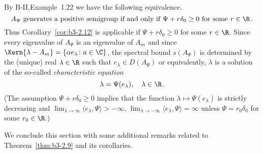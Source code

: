 \begin{example}
\begin{enumerate}[(i), wide]
By B-II,Example~1.22 we have the following equivalence.
\begin{equation}\label{eq:b3-2.29}
	A_{\Psi} \text{ generates a positive semigroup if and only if } \Psi + r\delta_{0} \geq 0 \text{ for some } r \in \R\,.
\end{equation}
Thus Corollary~\ref{cor:b3-2.12} is applicable if $\Psi + r\delta_{0} \geq 0$ for some $r \in \R$.
Since every eigenvalue of $A_{\Psi}$ is an eigenvalue of $A_{m}$ and since $\Kern{\lambda-A_{m}} = \{\alpha e_{\lambda} \colon a \in \C\}$, the spectral bound $s(A_{\Psi})$ is determined by the (unique) real $\lambda \in \R$ such that $e_{\lambda} \in D(A_{\Psi})$ or equivalently, $\lambda$ is a solution of the so-called \emph{characteristic equation}
\begin{equation}\label{eq:b3-2.30}
	\lambda = \Psi(e_{\lambda}), \quad \lambda \in \R\,.
\end{equation}
(The assumption $\Psi + r\delta_{0} \geq 0$ implies that the function $\lambda \mapsto \Psi(e_{\lambda})$ is strictly decreasing and $\lim_{\lambda \to \infty}\langle e_{\lambda},\Psi \rangle > -\infty$, $\lim_{\lambda \to -\infty}\langle e_{\lambda},\Psi \rangle = \infty$ unless $\Psi = r_{0}\delta_{0}$ for some $r_{0} \in \R$.)
\end{enumerate}

\end{example}
We conclude this section with some additional remarks related to Theorem~\ref{thm:b3-2.9} and its corollaries.
